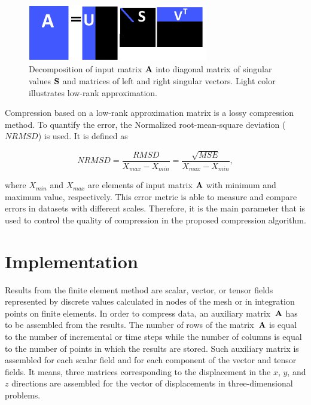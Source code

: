 \begin{figure}[H]
\centering
\includegraphics[width=0.7\textwidth]{figures/chapter-SVD/low_rank_decomposition_diagram}
\decoRule
\caption[Singular value decomposition illustration.]{Decomposition of input matrix $\mathbf{A}$ into diagonal matrix of singular values $\mathbf{S}$ and matrices of left and right singular vectors. Light color illustrates low-rank approximation.}
\label{fig:lowrank_svd}
\end{figure}


Compression based on a low-rank approximation matrix is a lossy compression method. To quantify the error, the Normalized root-mean-square deviation ($\mathit{NRMSD}$) is used. It is defined as

\begin{equation}
\mathit{NRMSD} = \frac{\mathit{RMSD}}{X_{max}-X_{min}}=\frac{\sqrt{\mathit{MSE}}}{X_{max}-X_{min}},
\label{eq:nrmsd-def}
\end{equation}

\noindent
where $X_{min}$ and $X_{max}$ are elements of input matrix $\mathbf{A}$ with minimum and maximum value, respectively. This error metric is able to measure and compare errors in datasets with different scales. Therefore, it is the main parameter that is used to control the quality of compression in the proposed compression algorithm.

\section{Implementation}

Results from the finite element method are scalar, vector, or tensor fields represented by discrete values calculated in nodes of the mesh or in integration points on finite elements. In order to compress data, an auxiliary matrix~$\mathbf{A}$ has to be assembled from the results. The number of rows of the matrix~$\mathbf{A}$ is equal to the number of incremental or time steps while the number of columns is equal to the number of points in which the results are stored. Such auxiliary matrix is assembled for each scalar field and for each component of the vector and tensor fields. It means, three matrices corresponding to the displacement in the $x$, $y$, and $z$ directions are assembled for the vector of displacements in three-dimensional problems.

